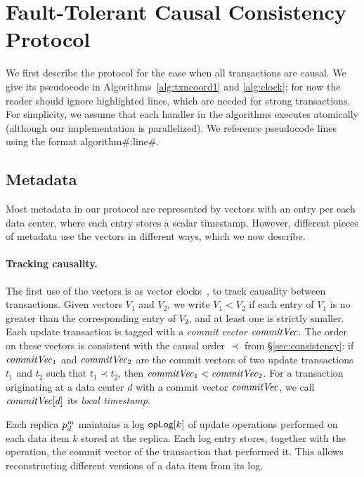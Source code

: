 \section{Fault-Tolerant Causal Consistency Protocol}

We first describe the \System protocol for the case when all transactions are
causal.  We give its pseudocode in Algorithms~\ref{alg:txncoord1} and
\ref{alg:clock}; for now the reader should ignore highlighted lines, which are
needed for strong transactions. For simplicity, we assume that each handler in
the algorithms executes atomically (although our implementation is
parallelized). We reference pseudocode lines using the format
algorithm\#:line\#.


\subsection{Metadata}
\label{sec:metadata}

Most metadata in our protocol are represented by vectors with an entry per each
data center, where each entry stores a scalar timestamp. However, different
pieces of metadata use the vectors in different ways, which we now describe.


\paragraph{Tracking causality.}
The first use of the vectors is as vector
clocks~\cite{vectorclocks1,vectorclocks2}, to track causality between
transactions. Given vectors $V_1$ and $V_2$, we write $V_1 < V_2$ if each entry
of $V_1$ is no greater than the corresponding entry of $V_2$, and at least one
is strictly smaller. Each update transaction is tagged with a \emph{commit
  vector} $\commitvector$. The order on these vectors is consistent with the
causal order $\prec$ from \S\ref{sec:consistency}: if $\commitvector_1$ and
$\commitvector_2$ are the commit vectors of two update transactions $t_1$ and
$t_2$ such that $t_1 \prec t_2$, then $\commitvector_1 < \commitvector_2$. For a
transaction originating at a data center $d$ with a commit vector $\commitvector$,
we call $\commitvector[d]$ its {\em local timestamp}.

Each replica $\partition^m_d$ maintains a
log ${\sf opLog}[k]$ of update operations performed on each data item $k$ stored at
the replica. Each log entry stores, together with the operation, the commit
vector of the transaction that performed it. This allows reconstructing
different versions of a data item from its log.

